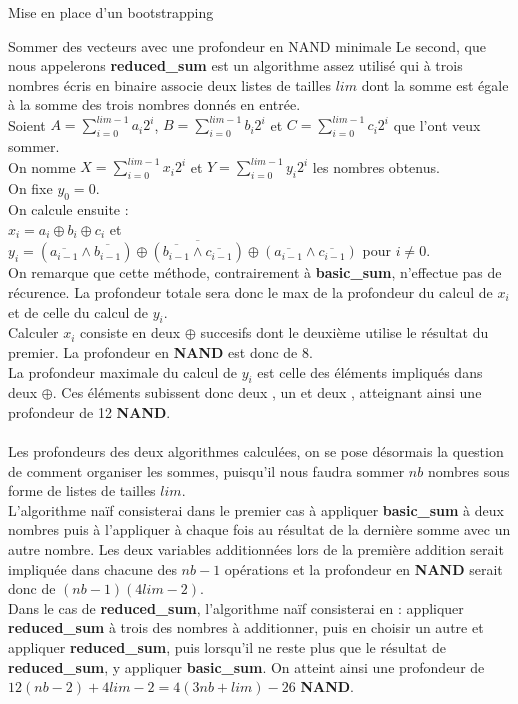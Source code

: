 \begin{section}{Mise en place d'un bootstrapping}
\begin{subsection}{Sommer des vecteurs avec une profondeur en NAND minimale}
Le second, que nous appelerons \textbf{reduced\_sum} est un algorithme assez utilisé qui à trois nombres écris en binaire associe deux listes de tailles $lim$ dont la somme est égale à la somme des trois nombres donnés en entrée. \\
Soient $A = \sum\limits_{i=0}^{lim-1} a_i 2^i$, $B = \sum\limits_{i=0}^{lim-1} b_i 2^i$ et $C = \sum\limits_{i=0}^{lim-1} c_i 2^i$ que l'ont veux sommer. \\
On nomme $X = \sum\limits_{i=0}^{lim-1} x_i 2^i$  et $Y = \sum\limits_{i=0}^{lim-1} y_i 2^i$ les nombres obtenus. \\
On fixe $y_0 = 0$. \\
On calcule ensuite : \\
$x_i = a_i \oplus b_i \oplus c_i$ et \\
$y_i = \overline{(\overline{a_{i-1}} \land \overline{b_{i-1}}) \oplus (\overline{b_{i-1}} \land \overline{c_{i-1}}) \oplus (\overline{a_{i-1}} \land \overline{c_{i-1}})}$ pour $i \neq 0$. \\
On remarque que cette méthode, contrairement à \textbf{basic\_sum}, n'effectue pas de récurence. La profondeur totale sera donc le max de la profondeur du calcul de $x_i$ et de celle du calcul de $y_i$. \\
Calculer $x_i$ consiste en deux $\oplus$ succesifs dont le deuxième utilise le résultat du premier. La profondeur en \textbf{NAND} est donc de 8. \\
La profondeur maximale du calcul de $y_i$ est celle des éléments impliqués dans deux $\oplus$. Ces éléments subissent donc deux , un  et deux , atteignant ainsi une profondeur de 12 \textbf{NAND}.

\paragraph{}

Les profondeurs des deux algorithmes calculées, on se pose désormais la question de comment organiser les sommes, puisqu'il nous faudra sommer $nb$ nombres sous forme de listes de tailles $lim$. \\
L'algorithme naïf consisterai dans le premier cas à appliquer \textbf{basic\_sum} à deux nombres puis à l'appliquer à chaque fois au résultat de la dernière somme avec un autre nombre. Les deux variables additionnées lors de la première addition serait impliquée dans chacune des $nb-1$ opérations et la profondeur en \textbf{NAND} serait donc de $(nb-1)(4 lim - 2)$. \\
Dans le cas de \textbf{reduced\_sum}, l'algorithme naïf consisterai en : appliquer \textbf{reduced\_sum} à trois des nombres à additionner, puis en choisir un autre et appliquer \textbf{reduced\_sum}, puis lorsqu'il ne reste plus que le résultat de \textbf{reduced\_sum}, y appliquer \textbf{basic\_sum}. On atteint ainsi une profondeur de $12(nb - 2) + 4 lim - 2 = 4(3nb + lim) - 26$ \textbf{NAND}.


\end{subsection}
\end{section}
